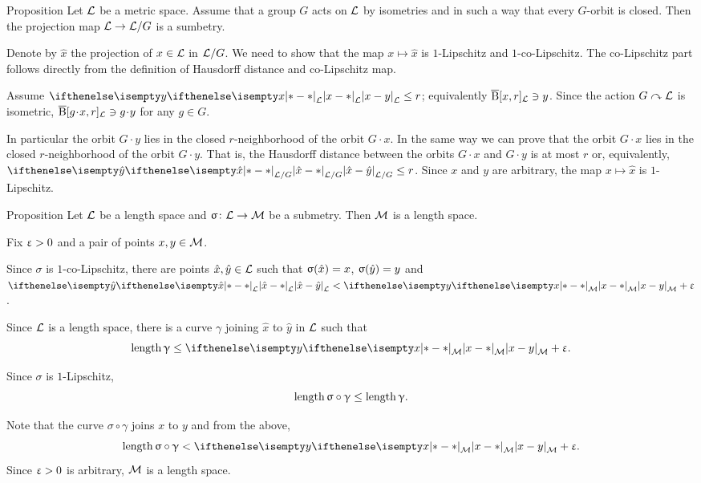 \begin{thm}{Proposition}\label{prop:submet/G}
Let $\mathcal{L}$ be a metric space.
Assume that a group $G$  acts on $\mathcal{L}$ by isometries  
and in such a way that every $G$-orbit is closed.
Then the projection map $\spc{L}\to \spc{L}/G$ is a sumbetry.
\end{thm}

Denote by $\hat x$ the projection of $x\in \spc{L}$ in $\mathcal{L}/G$.
We need to show that the map $x\mapsto\hat x$ is $1$-Lipschitz and $1$-co-Lipschitz.
The co-Lipschitz part follows directly from the definition of Hausdorff distance and co-Lipschitz map.

Assume $\dist{x}{y}{\spc{L}}\le r$; equivalently $\overline{\mathrm{B}}{}[x,r]_{\mathcal{L}}\ni y$.
Since the action $G\curvearrowright \mathcal{L}$ is isometric, 
$\cBall[g\cdot x,r]_{\spc{L}}\ni g\cdot y$ for any $g\in G$.

In particular the orbit $G\cdot y$ lies in the closed $r$-neighborhood of the orbit $G\cdot x$.
In the same way we can prove that the orbit $G\cdot x$ lies in the closed $r$-neighborhood of the orbit $G\cdot y$. 
That is, the Hausdorff distance between the orbits $G\cdot x$ and $G\cdot y$ is at most $r$
or, equivalently, $\dist{\hat x}{\hat y}{\spc{L}/G}\le r$.
Since $x$ and $y$ are arbitrary, the map $x\mapsto\hat x$ is $1$-Lipschitz.
\qeds


\begin{thm}{Proposition}
\label{prop:submet-length}
Let  $\mathcal{L}$ be a length space 
and $\sigma\:\spc{L}\to \spc{M}$ be a submetry.
Then $\mathcal{M}$ is a length space.
\end{thm}

Fix $\upvarepsilon>0$ and a pair of points $x,y\in \spc{M}$.

Since $\sigma$ is $1$-co-Lipschitz, there are points $\hat x,\hat y\in \spc{L}$
such that $\sigma(\hat x)\z=x$, $\sigma(\hat y)\z=y$ 
and $\dist{\hat x}{\hat y}{\spc{L}}<\dist{x}{y}{\spc{M}}+\eps$.

Since ${\mathcal{L}}$ is a length space, 
there is a curve $\gamma$ 
joining $\hat x$ to $\hat y$ in ${\mathcal{L}}$
such that
\[\length\gamma\le \dist{x}{y}{\spc{M}}+\eps.\]

Since $\sigma$ is $1$-Lipschitz,
\[\length\sigma\circ\gamma\le \length\gamma.\]

Note that the curve $\sigma\circ\gamma$ joins $x$ to $y$
and from the above,
\[\length\sigma\circ\gamma<\dist{x}{y}{\spc{M}}+\eps.\]
Since $\upvarepsilon>0$ is arbitrary,
$\mathcal{M}$ is a length space.
\qeds

